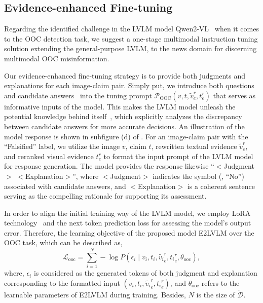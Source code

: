 \subsection{Evidence-enhanced Fine-tuning}

Regarding the identified challenge in the LVLM model Qwen2-VL~\cite{wang2024qwen2} when it comes to the OOC detection task, we suggest a one-stage multimodal instruction tuning solution extending the general-purpose LVLM, to the news domain for discerning multimodal OOC misinformation.

Our evidence-enhanced fine-tuning strategy is to provide both judgments and explanations for each image-claim pair. Simply put, we introduce both questions and candidate answers~\cite{shao2023prompting} into the tuning prompt $\mathcal{P}_\mathrm{OOC}(v,t,\widetilde{v}^r_e,{t}^r_e)$ that serves as informative inputs of the model. This makes the LVLM model unleash the potential knowledge behind itself~\cite{liu2024fka}, which explicitly analyzes the discrepancy between candidate answers for more accurate decisions. An illustration of the model response is shown in subfigure (d) of . For an image-claim pair with the ``Falsified'' label, we utilize the image $v$, claim $t$, rewritten textual evidence $\widetilde{v}^r_e$, and reranked visual evidence ${t}^r_e$ to format the input prompt of the LVLM model for response generation. The model provides the response likewise ``$<$Judgment$>$ $<$Explanation$>$'', where $<$Judgment$>$ indicates the symbol (\ie, ``No'') associated with candidate answers, and $<$Explanation$>$ is a coherent sentence serving as the compelling rationale for supporting its assessment.

In order to align the initial training way of the LVLM model, we employ LoRA technology~\cite{hu2022lora} and the next token prediction loss for assessing the model’s output error. Therefore, the learning objective of the proposed model E2LVLM over the OOC task, which can be described as,
\begin{equation}\label{eq:vcg_5}
    \mathcal{L}_{\mathrm{ooc}} = \sum_{i=1}^{N} -\log P(\epsilon_i \mid v_i,t_i,\widetilde{v_i}^r_e, {t_i}^r_e, \theta_{\mathrm{ooc}}),
\end{equation}
where, $\epsilon_i$ is considered as the generated tokens of both judgment and explanation corresponding to the formatted input $(v_i,t_i,\widetilde{v_i}^r_e,{t_i}^r_e)$, and $\theta_{\mathrm{ooc}}$ refers to the learnable parameters of E2LVLM during training. Besides, $N$ is the size of $\widetilde{\mathcal{D}}$.